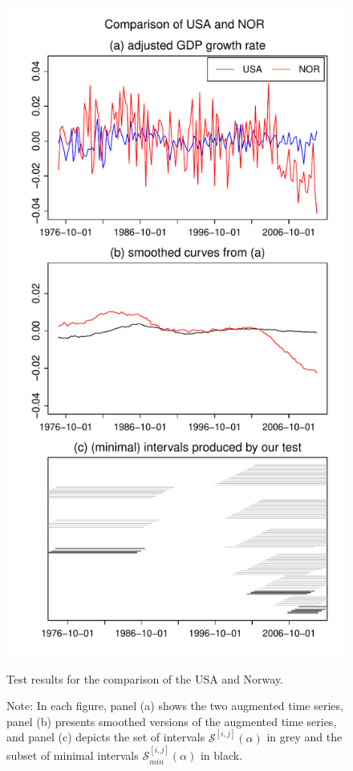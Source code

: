 \documentclass[a4paper,12pt]{article}
\begin{document}
\begin{figure}[t!]
\hspace{0.25cm}
\begin{minipage}[t]{0.49\textwidth}
\includegraphics[width=\textwidth]{Plots/USA_vs_NOR}
\caption{Test results for the comparison of the USA and Norway.}\label{fig:USA:Norway}
\end{minipage}

\caption*{Note: In each figure, panel (a) shows the two augmented time series, panel (b) presents smoothed versions of the augmented time series, and panel (c) depicts the set of intervals $\mathcal{S}^{[i,j]}(\alpha)$ in grey and the subset of minimal intervals $\mathcal{S}^{[i,j]}_{min}(\alpha)$ in black.}
\end{figure}
\end{document}
